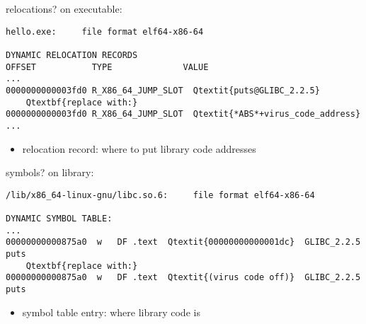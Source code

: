 \begin{frame}[fragile,label=relocReplace]{relocations?}
on executable:
\begin{Verbatim}[commandchars=Q\{\},fontsize=\fontsize{8}{9}\selectfont]
hello.exe:     file format elf64-x86-64

DYNAMIC RELOCATION RECORDS
OFFSET           TYPE              VALUE 
...
0000000000003fd0 R_X86_64_JUMP_SLOT  Qtextit{puts@GLIBC_2.2.5}
    Qtextbf{replace with:}
0000000000003fd0 R_X86_64_JUMP_SLOT  Qtextit{*ABS*+virus_code_address}
...
\end{Verbatim}
\begin{itemize}
\item relocation record: where to put library code addresses
\end{itemize}
\end{frame}


\begin{frame}[fragile,label=symReplace]{symbols?}
on library:
\begin{Verbatim}[commandchars=Q\{\},fontsize=\fontsize{8}{9}\selectfont]
/lib/x86_64-linux-gnu/libc.so.6:     file format elf64-x86-64

DYNAMIC SYMBOL TABLE:
...
00000000000875a0  w   DF .text  Qtextit{00000000000001dc}  GLIBC_2.2.5 puts
    Qtextbf{replace with:}
00000000000875a0  w   DF .text  Qtextit{(virus code off)}  GLIBC_2.2.5 puts
\end{Verbatim}
\begin{itemize}
\item symbol table entry: where library code is
\end{itemize}
\end{frame}


